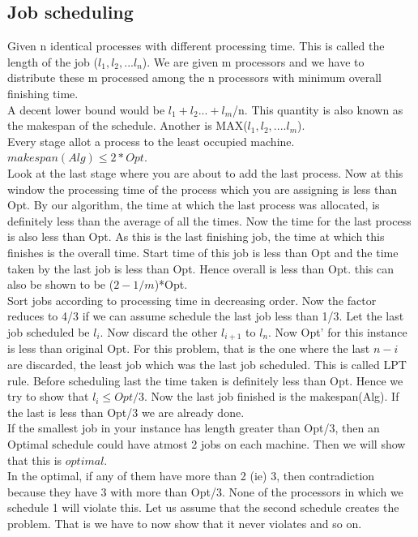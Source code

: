 \documentclass[solution,addpoints,12pt]{exam}
\begin{document}
\subsection{Job scheduling}
Given n identical processes with different processing time. This
is called the length of the job ($l_1, l_2, ...l_n$). We are given
m processors and we have to distribute these m processed among the n
processors with minimum overall finishing time.\\
A decent lower bound would be $l_1+l_2...+l_m$/n. This quantity
is also known as the makespan of the schedule. Another is
MAX($l_1, l_2, .... l_m$).\\

Every stage allot a process to the least occupied machine.
$makespan(Alg) \le 2*Opt$.\\
Look at the last stage where you are about to add the last process.
Now at this window the processing time of the process which you are assigning
is less than Opt. By our algorithm, the time at which the last process was
allocated, is definitely less than the average of all the times. Now the time
for the last process is also less than Opt. As this is the last finishing job,
the time at which this finishes is the overall time. Start time
of this job is less than Opt and the time taken by the last job is less
than Opt. Hence overall is less than Opt. this can also be shown to be
($2-1/m$)*Opt.\\

Sort jobs according to processing time in decreasing order.
Now the factor reduces to 4/3 if we can assume schedule the last job
less than 1/3. Let the last job scheduled be $l_i$. Now discard the
other $l_{i+1}$ to $l_n$. Now Opt' for this instance is less than
original Opt. For this problem, that is the one where the last $n-i$ are
discarded, the least job which was the last
job scheduled. This is called LPT rule. Before scheduling last
the time taken is definitely less than Opt. Hence we try to show
that $l_i \le Opt/3$. Now the last job finished
is the makespan(Alg). If the last is less than Opt/3 we are already done.\\
If the smallest job in your instance has length greater than Opt/3,
then an Optimal schedule could have atmost 2 jobs on each machine.
Then we will show that this is $optimal$.\\
In the optimal, if any of them have more than 2 (ie) 3, then contradiction because
they have 3 with more than Opt/3. None of the processors
in which we schedule 1 will violate this. Let us assume that the second
schedule creates the problem. That is we have to now show that it never
violates and so on.\\
\end{document}
